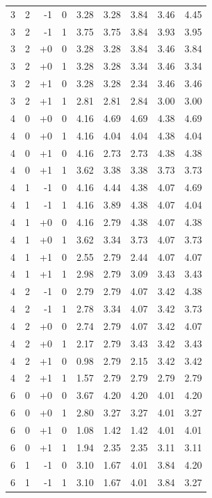 \begin{tabular}{@{}rrrrrrrrr@{}}
3 & 2 & -1 & 0 & 3.28 & 3.28 & 3.84 & 3.46 & 4.45 \\
3 & 2 & -1 & 1 & 3.75 & 3.75 & 3.84 & 3.93 & 3.95 \\
3 & 2 & +0 & 0 & 3.28 & 3.28 & 3.84 & 3.46 & 3.84 \\
3 & 2 & +0 & 1 & 3.28 & 3.28 & 3.34 & 3.46 & 3.34 \\
3 & 2 & +1 & 0 & 3.28 & 3.28 & 2.34 & 3.46 & 3.46 \\
3 & 2 & +1 & 1 & 2.81 & 2.81 & 2.84 & 3.00 & 3.00 \\
4 & 0 & +0 & 0 & 4.16 & 4.69 & 4.69 & 4.38 & 4.69 \\
4 & 0 & +0 & 1 & 4.16 & 4.04 & 4.04 & 4.38 & 4.04 \\
4 & 0 & +1 & 0 & 4.16 & 2.73 & 2.73 & 4.38 & 4.38 \\
4 & 0 & +1 & 1 & 3.62 & 3.38 & 3.38 & 3.73 & 3.73 \\
4 & 1 & -1 & 0 & 4.16 & 4.44 & 4.38 & 4.07 & 4.69 \\
4 & 1 & -1 & 1 & 4.16 & 3.89 & 4.38 & 4.07 & 4.04 \\
4 & 1 & +0 & 0 & 4.16 & 2.79 & 4.38 & 4.07 & 4.38 \\
4 & 1 & +0 & 1 & 3.62 & 3.34 & 3.73 & 4.07 & 3.73 \\
4 & 1 & +1 & 0 & 2.55 & 2.79 & 2.44 & 4.07 & 4.07 \\
4 & 1 & +1 & 1 & 2.98 & 2.79 & 3.09 & 3.43 & 3.43 \\
4 & 2 & -1 & 0 & 2.79 & 2.79 & 4.07 & 3.42 & 4.38 \\
4 & 2 & -1 & 1 & 2.78 & 3.34 & 4.07 & 3.42 & 3.73 \\
4 & 2 & +0 & 0 & 2.74 & 2.79 & 4.07 & 3.42 & 4.07 \\
4 & 2 & +0 & 1 & 2.17 & 2.79 & 3.43 & 3.42 & 3.43 \\
4 & 2 & +1 & 0 & 0.98 & 2.79 & 2.15 & 3.42 & 3.42 \\
4 & 2 & +1 & 1 & 1.57 & 2.79 & 2.79 & 2.79 & 2.79 \\
6 & 0 & +0 & 0 & 3.67 & 4.20 & 4.20 & 4.01 & 4.20 \\
6 & 0 & +0 & 1 & 2.80 & 3.27 & 3.27 & 4.01 & 3.27 \\
6 & 0 & +1 & 0 & 1.08 & 1.42 & 1.42 & 4.01 & 4.01 \\
6 & 0 & +1 & 1 & 1.94 & 2.35 & 2.35 & 3.11 & 3.11 \\
6 & 1 & -1 & 0 & 3.10 & 1.67 & 4.01 & 3.84 & 4.20 \\
6 & 1 & -1 & 1 & 3.10 & 1.67 & 4.01 & 3.84 & 3.27 \\

\end{tabular}
